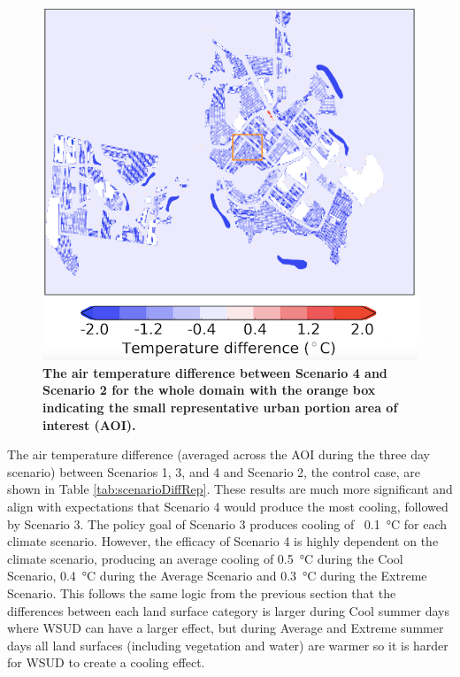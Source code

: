 \documentclass[final,3p,times,authoryear]{elsarticle}
\begin{document}
\begin{figure}[!htbp]
\centering   
\includegraphics[scale=0.40]{images/fig2}
\caption{\bf The air temperature difference between Scenario 4 and Scenario 2 for the whole domain with the orange box indicating the small representative urban portion area of interest (AOI).}    
 \label{fig:temp_diff_repre} 
\end{figure}

The air temperature difference (averaged across the AOI during the three day scenario) between Scenarios 1, 3, and 4 and Scenario 2, the control case, are shown in Table \ref{tab:scenarioDiffRep}. These results are much more significant and align with expectations that Scenario 4 would produce the most cooling, followed by Scenario 3. The policy goal of Scenario 3 produces cooling of ~0.1\SI{}{\degreeCelsius} for each climate scenario. However, the efficacy of Scenario 4 is highly dependent on the climate scenario, producing an average cooling of 0.5\SI{}{\degreeCelsius} during the Cool Scenario, 0.4\SI{}{\degreeCelsius} during the Average Scenario and 0.3\SI{}{\degreeCelsius} during the Extreme Scenario. This follows the same logic from the previous section that the differences between each land surface category is larger during Cool summer days where WSUD can have a larger effect, but during Average and Extreme summer days all land surfaces (including vegetation and water) are warmer so it is harder for WSUD to create a cooling effect.
\end{document}
